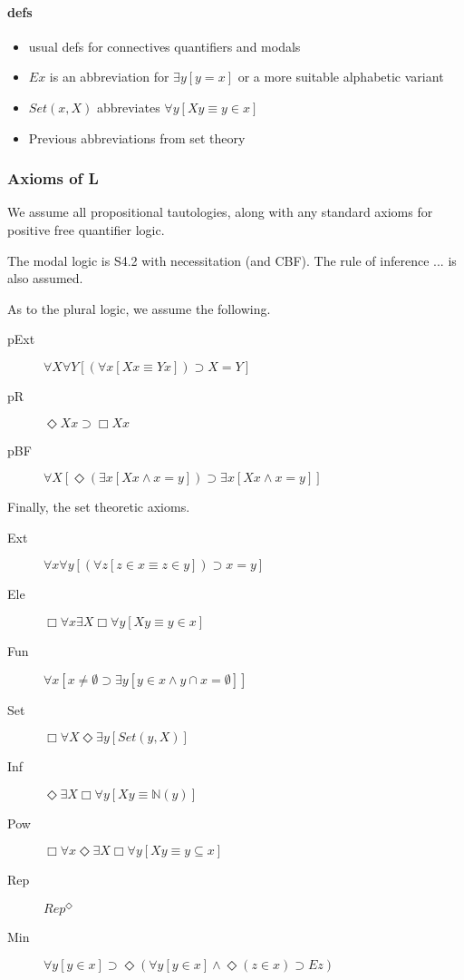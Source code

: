\documentclass{article}
\begin{document}
\paragraph{defs}
\begin{itemize}
    \item usual defs for connectives quantifiers and modals
    \item $Ex$ is an abbreviation for $\exists y[y = x]$ or a more suitable alphabetic variant
    \item $Set(x, X)$ abbreviates $\forall y[Xy \equiv y \in x]$
    \item Previous abbreviations from set theory
\end{itemize}
\subsubsection{Axioms of L}
We assume all propositional tautologies, along with any standard axioms for positive free quantifier logic.

The modal logic is S4.2 with necessitation (and CBF). The rule of inference ... is also assumed.

As to the plural logic, we assume the following.
\begin{description}
    \item[pExt] $\forall X \forall Y [(\forall x[Xx \equiv Yx]) \supset X = Y]$
    \item[pR] $ \Diamond Xx \supset \Box Xx$
    \item[pBF] $\forall X[ \Diamond (\exists x[Xx \wedge x = y]) \supset \exists x [Xx \wedge x = y]]$
\end{description}
Finally, the set theoretic axioms.
\begin{description}
    \item[Ext] $\forall x \forall y [(\forall z[z \in x \equiv z \in y]) \supset x = y]$
    \item[Ele] $\Box \forall x \exists X \Box \forall y[Xy \equiv y \in x]$
    \item[Fun] $\forall x[ x \not = \emptyset \supset \exists y[y \in x \wedge y \cap x = \emptyset]]$
    \item[Set] $\Box \forall X \Diamond \exists y [Set(y, X)]$
    \item[Inf] $\Diamond \exists X\Box \forall y[Xy \equiv \mathbb{N}(y)]$
    \item[Pow] $\Box \forall x \Diamond \exists X \Box \forall y [Xy \equiv y \subseteq x]$
    \item[Rep] $Rep^\Diamond$
    \item[Min] $\forall y[ y \in x] \supset \Diamond(\forall y[y \in x] \wedge \Diamond (z \in x) \supset Ez)$ 
\end{description}
\end{document}
